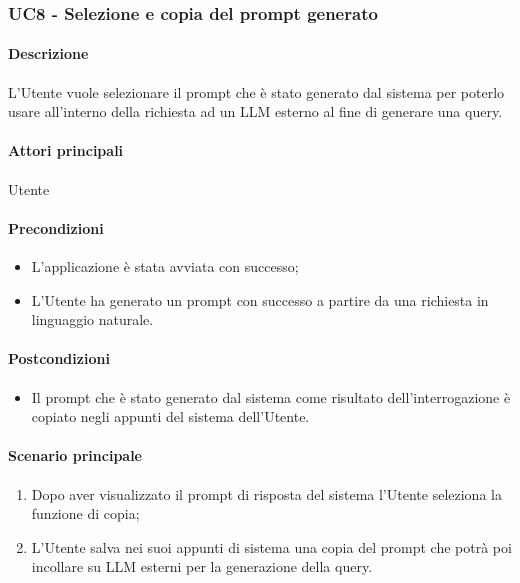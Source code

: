 \subsubsection{UC8 - Selezione e copia del prompt generato}\label{UC8}

\paragraph*{Descrizione}
L’Utente vuole selezionare il prompt che è stato generato dal sistema per poterlo usare all’interno della richiesta ad un LLM esterno al fine di generare una query.

\paragraph*{Attori principali}
Utente

\paragraph*{Precondizioni}
\begin{itemize}
  \item L'applicazione è stata avviata con successo;
  \item L’Utente ha generato un prompt con successo a partire da una richiesta in linguaggio naturale.  
\end{itemize}

\paragraph*{Postcondizioni}
\begin{itemize}
  \item Il prompt che è stato generato dal sistema come risultato dell’interrogazione è copiato negli appunti del sistema dell’Utente.
\end{itemize}

\paragraph*{Scenario principale}
\begin{enumerate}
  \item Dopo aver visualizzato il prompt di risposta del sistema l’Utente seleziona la funzione di copia;
  \item L’Utente salva nei suoi appunti di sistema una copia del prompt che potrà poi incollare su LLM esterni per la generazione della query.
\end{enumerate}